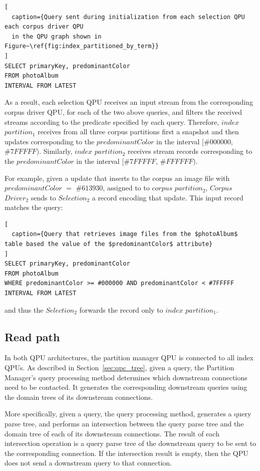 \begin{lstlisting}[
  caption={Query sent during initialization from each selection QPU each corpus driver QPU
  in the QPU graph shown in Figure~\ref{fig:index_partitioned_by_term}}
]
SELECT primaryKey, predominantColor
FROM photoAlbum
INTERVAL FROM LATEST
\end{lstlisting}

\noindent
As a result, each selection QPU receives an input stream from the corresponding corpus driver QPU,
for each of the two above queries,
and filters the received streams according to the predicate specified by each query.
Therefore, $index$ $partition_1$ receives from all three corpus partitions first a snapshot and then updates
corresponding to the $predominantColor$ in the interval $[\#000000$, $\#7FFFFF)$.
Similarly, $index$ $partition_2$ receives stream records corresponding to the $predominantColor$ in the interval
$[\#7FFFFF$, $\#FFFFFF)$.

For example, given a update that inserts to the corpus an image file with $predominantColor$ $=$ $\#613930$, assigned to to $corpus$
$partition_2$, $Corpus$ $Driver_2$ sends to $Selection_2$ a record encoding that update.
This input record matches the query:

\begin{lstlisting}[
  caption={Query that retrieves image files from the $photoAlbum$ table based the value of the $predominantColor$ attribute}
]
SELECT primaryKey, predominantColor
FROM photoAlbum
WHERE predominantColor >= #000000 AND predominantColor < #7FFFFF
INTERVAL FROM LATEST
\end{lstlisting}

\noindent
and thus the $Selection_2$  forwards the record only to $index$ $partition_1$.

\subsection{Read path}
\label{sec:cs_index_partitioning_read_path}

In both QPU architectures, the partition manager QPU is connected to all index QPUs.
As described in Section~\ref{sec:qpc_tree}, given a query,
the Partition Manager's query processing method determines which downstream connections need to be contacted.
It generates the corresponding downstream queries using the domain trees of its downstream connections.

More specifically, given a query,
the query processing method, generates a query parse tree,
and performs an intersection between the query parse tree and the domain tree of each of its downstream connections.
The result of each intersection operation is a query parse tree of the downstream query to be sent to the corresponding
connection.
If the intersection result is empty, then the QPU does not send a downstream query to that connection.

